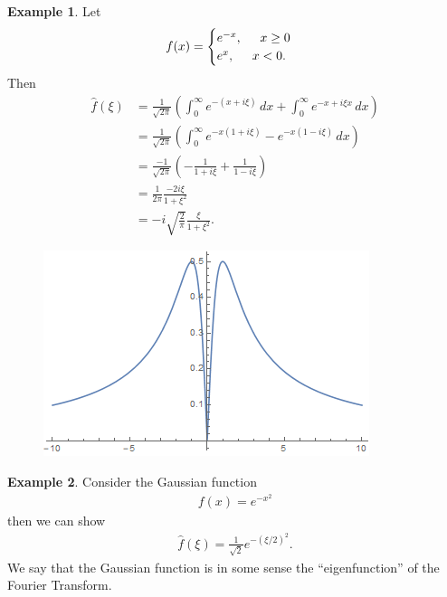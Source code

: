 \documentclass{book}
\theoremstyle{definition}
\newtheorem{exmp}{Example}[section]
\begin{document}
\begin{exmp}
 	Let 
 	\begin{align*}
 	f(x) =
 	\begin{cases}
 	e^{-x}, \hspace{0.5cm} x\geq 0\\
 	e^{x}, \hspace{0.5cm} x < 0.
 	\end{cases}
 	\end{align*}	
 	Then
 	\begin{align*}
 	\hat{f}(\xi) &= \frac{1}{\sqrt{2\pi}}\left(\int^\infty_0 e^{-(x+i\xi)}\,dx + \int^\infty_0 e^{-x + i\xi x}\,dx \right)\\
 	&= \frac{1}{\sqrt{2\pi}}\left(\int^\infty_0 e^{-x(1+i\xi)} - e^{-x(1-i\xi)}\,dx\right)\\
 	&= \frac{-1}{\sqrt{2\pi}}\left(-\frac{1}{1+i\xi} + \frac{1}{1-i\xi}\right)\\
 	&= \frac{1}{2\pi}\frac{-2i\xi}{1+\xi^2}\\
 	&= -i\sqrt{\frac{2}{\pi}}\frac{\xi}{1+\xi^2}.
 	\end{align*}
 	\begin{figure}[h!]
 		\centering
 		\includegraphics[scale=1]{fourier_2.png}
 	\end{figure}
\end{exmp}



\newpage


\begin{exmp}
	Consider the Gaussian function
	\begin{align*}
	f(x) = e^{-x^2}
	\end{align*}
	then we can show
	\begin{align*}
	\hat{f}(\xi) = \frac{1}{\sqrt{2}}e^{-(\xi/2)^2}.
	\end{align*}
	We say that the Gaussian function is in some sense the ``eigenfunction'' of the Fourier Transform.
\end{exmp}
$\,$\\
\end{document}
